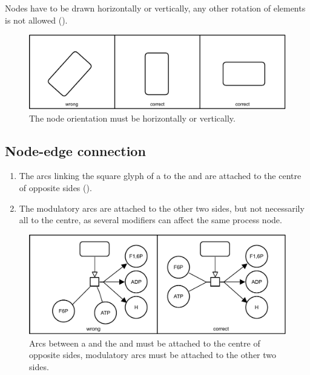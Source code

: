 Nodes have to be drawn horizontally or vertically, any other
rotation of elements is not allowed ().

\begin{figure}[htb]
  \centering
  \includegraphics[scale=0.8]{images/layout-orientation}
  \caption{The node orientation must be horizontally or
  vertically.}\label{fig:layout5}
\end{figure}

\subsection{Node-edge connection}

\begin{enumerate}
\item The arcs linking the square glyph of a  to the  and 
 are attached to the centre of opposite sides ().
\item The modulatory arcs are attached to the other two sides, but not necessarily all to the centre, as several modifiers can affect the same process node.
\end{enumerate}

\begin{figure}[htb]
  \centering
  \includegraphics[scale=0.8]{images/layout-connecting-arcs}
  \caption{Arcs between a   and the  and  must be attached to the centre of opposite sides, modulatory
  arcs must be attached to the other two sides.}\label{fig:layout6}
\end{figure}


